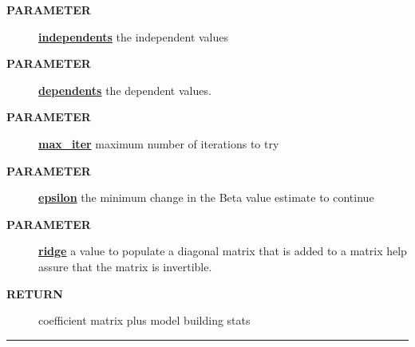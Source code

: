 \par
\begin{description}
\item [\colorbox{tagtype}{\color{white} \textbf{\textsf{PARAMETER}}}] \textbf{\underline{independents}} the independent values
\item [\colorbox{tagtype}{\color{white} \textbf{\textsf{PARAMETER}}}] \textbf{\underline{dependents}} the dependent values.
\item [\colorbox{tagtype}{\color{white} \textbf{\textsf{PARAMETER}}}] \textbf{\underline{max\_iter}} maximum number of iterations to try
\item [\colorbox{tagtype}{\color{white} \textbf{\textsf{PARAMETER}}}] \textbf{\underline{epsilon}} the minimum change in the Beta value estimate to continue
\item [\colorbox{tagtype}{\color{white} \textbf{\textsf{PARAMETER}}}] \textbf{\underline{ridge}} a value to populate a diagonal matrix that is added to a matrix help assure that the matrix is invertible.
\item [\colorbox{tagtype}{\color{white} \textbf{\textsf{RETURN}}}] \textbf{\underline{}} coefficient matrix plus model building stats
\end{description}

\rule{\linewidth}{0.5pt}
